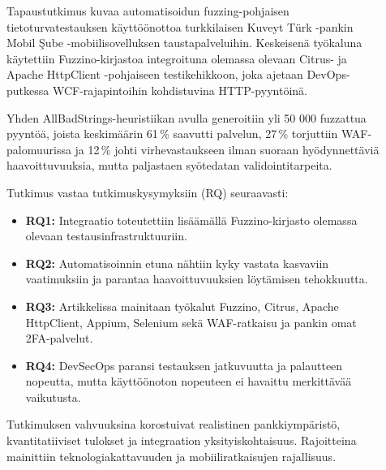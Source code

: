\documentclass[bscthesis,finnish,oneside,biblatex]{uefcsthesis}
\begin{document}
    \begin{description}
        \item[\cite{schneider_2020_fuzzing}]
        Tapaustutkimus kuvaa automatisoidun fuzzing-pohjaisen tietoturvatestauksen käyttöönottoa turkkilaisen Kuveyt Türk -pankin Mobil Şube -mobiilisovelluksen taustapalveluihin. Keskeisenä työkaluna käytettiin Fuzzino-kirjastoa integroituna olemassa olevaan Citrus- ja Apache HttpClient -pohjaiseen testikehikkoon, joka ajetaan DevOps-putkessa WCF-rajapintoihin kohdistuvina HTTP-pyyntöinä.

        Yhden AllBadStrings-heuristiikan avulla generoitiin yli 50 000 fuzzattua pyyntöä, joista keskimäärin 61\,\% saavutti palvelun, 27\,\% torjuttiin WAF-palomuurissa ja 12\,\% johti virhevastaukseen ilman suoraan hyödynnettäviä haavoittuvuuksia, mutta paljastaen syötedatan validointitarpeita.

        Tutkimus vastaa tutkimuskysymyksiin (RQ) seuraavasti:
        \begin{itemize}
            \item \textbf{RQ1:} Integraatio toteutettiin lisäämällä Fuzzino-kirjasto olemassa olevaan testausinfrastruktuuriin.
            \item \textbf{RQ2:} Automatisoinnin etuna nähtiin kyky vastata kasvaviin vaatimuksiin ja parantaa haavoittuvuuksien löytämisen tehokkuutta.
            \item \textbf{RQ3:} Artikkelissa mainitaan työkalut Fuzzino, Citrus, Apache HttpClient, Appium, Selenium sekä WAF-ratkaisu ja pankin omat 2FA-palvelut.
            \item \textbf{RQ4:} DevSecOps paransi testauksen jatkuvuutta ja palautteen nopeutta, mutta käyttöönoton nopeuteen ei havaittu merkittävää vaikutusta.
        \end{itemize}

        Tutkimuksen vahvuuksina korostuivat realistinen pankkiympäristö, kvantitatiiviset tulokset ja integraation yksityiskohtaisuus. Rajoitteina mainittiin teknologiakattavuuden ja mobiiliratkaisujen rajallisuus.
    \end{description}
\end{document}
